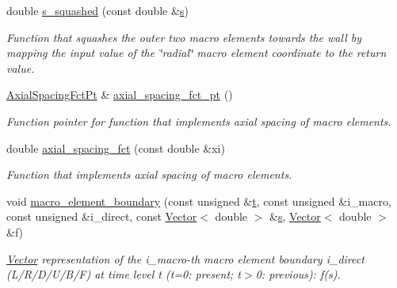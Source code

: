 \begin{DoxyCompactItemize}
double \hyperlink{classoomph_1_1QuarterTubeDomain_a6ecbb8cd59208abef45384d7780853e1}{s\+\_\+squashed} (const double \&\hyperlink{cfortran_8h_ab7123126e4885ef647dd9c6e3807a21c}{s})
\begin{DoxyCompactList}\small\item\em Function that squashes the outer two macro elements towards the wall by mapping the input value of the \char`\"{}radial\char`\"{} macro element coordinate to the return value. \end{DoxyCompactList}\item 
\hyperlink{classoomph_1_1QuarterTubeDomain_ae347af42a5dcb9b3b82c2247975b01db}{Axial\+Spacing\+Fct\+Pt} \& \hyperlink{classoomph_1_1QuarterTubeDomain_a05cf314c7317632829f96a30fee24cde}{axial\+\_\+spacing\+\_\+fct\+\_\+pt} ()
\begin{DoxyCompactList}\small\item\em Function pointer for function that implements axial spacing of macro elements. \end{DoxyCompactList}\item 
double \hyperlink{classoomph_1_1QuarterTubeDomain_a3574feea9f42e4ec95b6edec36da245a}{axial\+\_\+spacing\+\_\+fct} (const double \&xi)
\begin{DoxyCompactList}\small\item\em Function that implements axial spacing of macro elements. \end{DoxyCompactList}\item 
void \hyperlink{classoomph_1_1QuarterTubeDomain_afacee4fe8a6fbc33618643398f5b8ab1}{macro\+\_\+element\+\_\+boundary} (const unsigned \&\hyperlink{cfortran_8h_af6f0bd3dc13317f895c91323c25c2b8f}{t}, const unsigned \&i\+\_\+macro, const unsigned \&i\+\_\+direct, const \hyperlink{classoomph_1_1Vector}{Vector}$<$ double $>$ \&\hyperlink{cfortran_8h_ab7123126e4885ef647dd9c6e3807a21c}{s}, \hyperlink{classoomph_1_1Vector}{Vector}$<$ double $>$ \&f)
\begin{DoxyCompactList}\small\item\em \hyperlink{classoomph_1_1Vector}{Vector} representation of the i\+\_\+macro-\/th macro element boundary i\+\_\+direct (L/\+R/\+D/\+U/\+B/F) at time level t (t=0\+: present; t$>$0\+: previous)\+: f(s). \end{DoxyCompactList}\end{DoxyCompactItemize}
